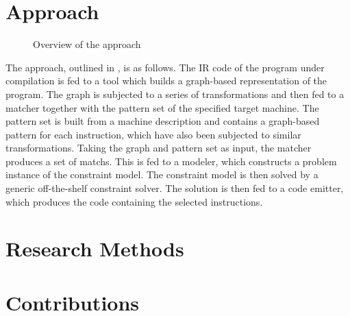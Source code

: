 \section{Approach}

\begin{figure}
  \centering%
  

  \caption{Overview of the approach}
\end{figure}

The approach, outlined in , is as follows.
%
The \gls{IR} code of the \gls{program} under compilation is fed to a tool which
builds a \gls{graph}-based representation of the \gls{program}.
%
The \gls{graph} is subjected to a series of transformations and then fed to a
matcher together with the \gls{pattern set} of the specified \gls{target
  machine}.
%
The \gls{pattern set} is built from a \gls{machine description} and contains a
\gls{graph}-based \gls{pattern} for each \gls{instruction}, which have also been
subjected to similar transformations.
%
Taking the \gls{graph} and \gls{pattern set} as input, the matcher produces a
set of \glspl{match}.
%
This is fed to a modeler, which constructs a problem instance of the
\gls{constraint model}.
%
The \gls{constraint model} is then solved by a generic off-the-shelf
\gls{constraint solver}.
%
The \gls{solution} is then fed to a code emitter, which produces the code
containing the selected \glspl{instruction}.



\section{Research Methods}


\section{Contributions}

